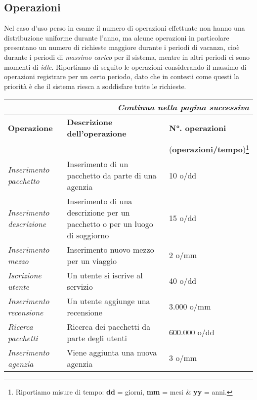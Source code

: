 \subsection{Operazioni}
Nel caso d'uso perso in esame il numero di operazioni effettuate non hanno una distribuzione uniforme durante l'anno, ma alcune operazioni in particolare presentano un numero di richieste maggiore durante i periodi di vacanza, cioè durante i periodi di \emph{massimo carico} per il sistema, mentre in altri periodi ci sono momenti di \emph{idle}. Riportiamo di seguito le operazioni considerando il massimo di operazioni registrare per un certo periodo, dato che in contesti come questi la priorità è che il sistema riesca a soddisfare tutte le richieste.
\newline
\begin{center}
    \begin{tabularx}{\textwidth}{p{} X p{}}
        \caption{Tabella delle operazioni}\\\toprule\endfirsthead
        \toprule\endhead
        \midrule\multicolumn{3}{r}{\itshape Continua nella pagina successiva}\\\midrule\endfoot
        \bottomrule\endlastfoot
        \textbf{Operazione} & \textbf{Descrizione dell'operazione} & \textbf{N°. operazioni}
        \\
        && (\textbf{operazioni/tempo})\footnote{Riportiamo misure di tempo: \textbf{dd} = giorni, \textbf{mm} = mesi \& \textbf{yy} = anni.}
        \\\midrule
        \emph{Inserimento pacchetto} & Inserimento di un pacchetto da parte di una agenzia & 10 o/dd
        \\\midrule
        \emph{Inserimento descrizione} & Inserimento di una descrizione per un pacchetto o per un luogo di soggiorno & 15 o/dd
        \\\midrule
        \emph{Inserimento mezzo} & Inserimento nuovo mezzo per un viaggio & 2 o/mm
        \\\midrule
        \emph{Iscrizione utente} & Un utente si iscrive al servizio & 40 o/dd
        \\\midrule
        \emph{Inserimento recensione} & Un utente aggiunge una recensione & 3.000 o/mm
        \\\midrule
        \emph{Ricerca pacchetti} & Ricerca dei pacchetti da parte degli utenti & 600.000 o/dd
        \\\midrule
        \emph{Inserimento agenzia} & Viene aggiunta una nuova agenzia & 3 o/mm

\end{tabularx}
\end{center}
